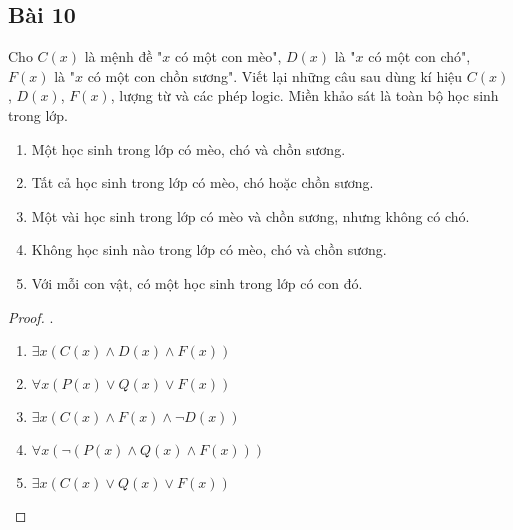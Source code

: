 \subsection*{Bài 10}
Cho $C(x)$ là mệnh đề "$x$ có một con mèo", $D(x)$ là "$x$ có một con chó", $F(x)$ là "$x$ có một con chồn sương". Viết lại những câu sau dùng kí hiệu $C(x)$, $D(x)$, $F(x)$, lượng từ và các phép logic. Miền khảo sát là toàn bộ học sinh trong lớp.
\begin{enumerate}[label=\alph*)]
    \item Một học sinh trong lớp có mèo, chó và chồn sương.
    \item Tất cả học sinh trong lớp có mèo, chó hoặc chồn sương.
    \item Một vài học sinh trong lớp có mèo và chồn sương, nhưng không có chó.
    \item Không học sinh nào trong lớp có mèo, chó và chồn sương.
    \item Với mỗi con vật, có một học sinh trong lớp có con đó.
\end{enumerate}
\begin{proof}.
    \begin{multicols}{2}
        \begin{enumerate}[label=\alph*)]
            \item $\exists x(C(x)\land D(x)\land F(x))$
            \item $\forall x(P(x)\lor Q(x)\lor F(x))$
            \item $\exists x(C(x)\land F(x)\land \neg D(x))$
            \item $\forall x(\neg(P(x)\land Q(x)\land F(x)))$
            \item $\exists x(C(x)\lor Q(x)\lor F(x))$
        \end{enumerate}
    \end{multicols}
\end{proof}

